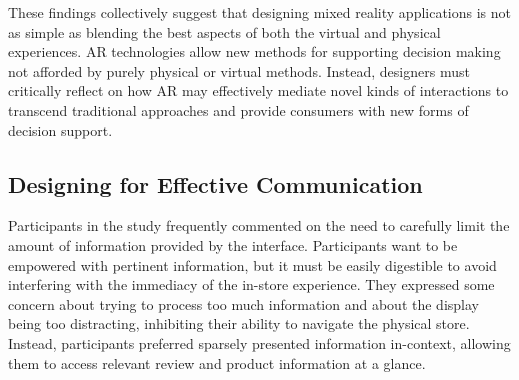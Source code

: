 These findings collectively suggest that designing mixed reality applications is not as simple as blending the best aspects of both the virtual and physical experiences. AR technologies allow new methods for supporting decision making not afforded by purely physical or virtual methods. Instead, designers must critically reflect on how AR may effectively mediate novel kinds of interactions to transcend traditional approaches and provide consumers with new forms of decision support. 

\subsection{Designing for Effective Communication}
Participants in the study frequently commented on the need to carefully limit the amount of information provided by the interface. Participants want to be empowered with pertinent information, but it must be easily digestible to avoid interfering with the immediacy of the in-store experience. They expressed some concern about trying to process too much information and about the display being too distracting, inhibiting their ability to navigate the physical store. Instead, participants preferred sparsely presented information in-context, allowing them to access relevant review and product information at a glance. 



